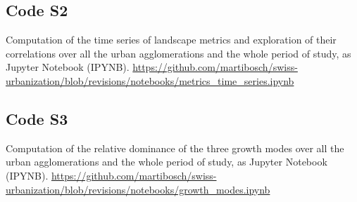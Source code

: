 \subsection*{Code S2}
\label{code-metrics-time-series}
Computation of the time series of landscape metrics and exploration of their correlations over all the urban agglomerations and the whole period of study, as Jupyter Notebook (IPYNB).
\url{https://github.com/martibosch/swiss-urbanization/blob/revisions/notebooks/metrics_time_series.ipynb}

\subsection*{Code S3}
\label{code-growth-modes}
Computation of the relative dominance of the three growth modes over all the urban agglomerations and the whole period of study, as Jupyter Notebook (IPYNB).
\url{https://github.com/martibosch/swiss-urbanization/blob/revisions/notebooks/growth_modes.ipynb}





